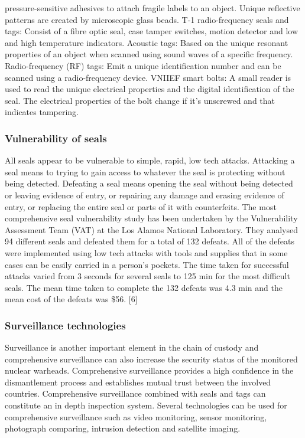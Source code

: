 \documentclass[twocolumn,a4paper]{article}
\begin{document}
pressure-sensitive adhesives to attach fragile labels to an
object. Unique reflective patterns are created by microscopic glass
beads.  T-1 radio-frequency seals and tags: Consist of a fibre optic
seal, case tamper switches, motion detector and low and high
temperature indicators.  Acoustic tags: Based on the unique resonant
properties of an object when scanned using sound waves of a specific
frequency.  Radio-frequency (RF) tags: Emit a unique identification
number and can be scanned using a radio-frequency device.  VNIIEF
smart bolts: A small reader is used to read the unique electrical
properties and the digital identification of the seal. The electrical
properties of the bolt change if it’s unscrewed and that indicates
tampering.

\subsubsection{Vulnerability of seals}
All seals appear to be vulnerable to simple, rapid, low tech
attacks. Attacking a seal means to trying to gain access to whatever
the seal is protecting without being detected. Defeating a seal means
opening the seal without being detected or leaving evidence of entry,
or repairing any damage and erasing evidence of entry, or replacing
the entire seal or parts of it with counterfeits. The most
comprehensive seal vulnerability study has been undertaken by the
Vulnerability Assessment Team (VAT) at the Los Alamos National
Laboratory. They analysed 94 different seals and defeated them for a
total of 132 defeats. All of the defeats were implemented using low
tech attacks with tools and supplies that in some cases can be easily
carried in a person’s pockets. The time taken for successful attacks
varied from 3 seconds for several seals to 125 min for the most
difficult seals. The mean time taken to complete the 132 defeats was
4.3 min and the mean cost of the defeats was \$56. [6]

\subsubsection{Surveillance technologies}
Surveillance is another important element in the chain of custody and
comprehensive surveillance can also increase the security status of
the monitored nuclear warheads. Comprehensive surveillance provides a
high confidence in the dismantlement process and establishes mutual
trust between the involved countries. Comprehensive surveillance
combined with seals and tags can constitute an in depth inspection
system. Several technologies can be used for comprehensive
surveillance such as video monitoring, sensor monitoring, photograph
comparing, intrusion detection and satellite
imaging. \citep{wuwen2004}
\end{document}

